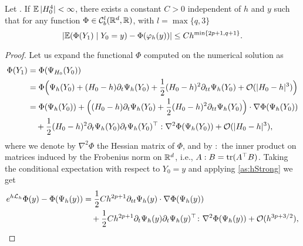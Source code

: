 \documentclass[10pt]{article}
\begin{document}
\begin{lemma}\label{lem:WeakLocalOrder} Let . If $\operatorname{\mathbb{E}}|H_0^4| < \infty$, there exists a constant $C > 0$ independent of $h$ and $y$ such that for any function $\Phi\in \mathcal C^l_b(\mathbb{R}^d, \mathbb{R})$, with $l = \max\{q, 3\}$
	\begin{equation}       
		\lvert\operatorname{\mathbb{E}}(\Phi(Y_1)\mid Y_0 = y) - \Phi(\varphi_h(y))\rvert \leq C h^{\min\{2p+1, q+1\}}.
	\end{equation}
\end{lemma}
\begin{proof}  Let us expand the functional $\Phi$ computed on the numerical solution as
	\begin{equation}\label{eq:TaylorNumericalSolution}
		\begin{aligned}
			\Phi(Y_1) &= \Phi(\Psi_{H_0}(Y_0)) \\
			&= \Phi\Big(\Psi_h(Y_0) + (H_0-h)\partial_t\Psi_h(Y_0) + \frac{1}{2}(H_0-h)^2\partial_{tt}\Psi_h(Y_0) + \mathcal{O}(\lvert H_0 - h\rvert^3)\Big)\\
			&= \Phi(\Psi_h(Y_0)) + \Big((H_0 - h)\partial_t\Psi_h(Y_0)+\frac{1}{2}(H_0-h)^2\partial_{tt}\Psi_h(Y_0)\Big) \cdot \nabla\Phi(\Psi_h(Y_0))\\
			&\quad + \frac{1}{2}(H_0 - h)^2 \partial_t \Psi_h(Y_0) \partial_t \Psi_h(Y_0)^\top : \nabla^2\Phi(\Psi_h(Y_0)) + \mathcal{O}(\lvert H_0 - h\rvert^3),
		\end{aligned}
	\end{equation}
	where we denote by $\nabla^2\Phi$ the Hessian matrix of $\Phi$, and by $:$ the inner product on matrices induced by the Frobenius norm on $\mathbb{R}^d$, i.e., $A : B = \operatorname{tr}(A^\top B)$. Taking the conditional expectation with respect to $Y_0 = y$ and applying \cref{as:hStrong} we get
	\begin{equation}\label{eq:TaylorNumericalSolution2}
		\begin{aligned}
			e^{h\mathcal{L}_h}\Phi(y) - \Phi(\Psi_h(y)) &= \frac{1}{2} Ch^{2p+1}\partial_{tt}\Psi_h(y)\cdot \nabla\Phi(\Psi_h(y))\\
			&\quad + \frac{1}{2} Ch^{2p+1}\partial_t \Psi_h(y) \partial_t \Psi_h(y)^\top  \colon \nabla^2\Phi(\Psi_h(y)) + \mathcal{O}(h^{3p+3/2}),
		\end{aligned}
	\end{equation}

\end{proof}
\end{document}
